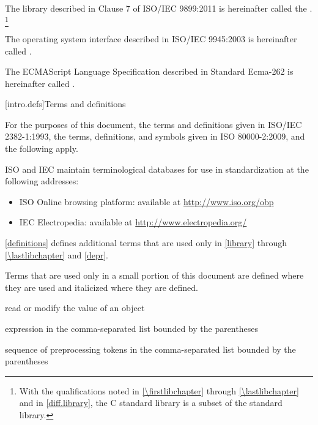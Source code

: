 \pnum
The library described in Clause 7 of ISO/IEC 9899:2011
is hereinafter called the
.%
\footnote{With the qualifications noted in \ref{\firstlibchapter}
through \ref{\lastlibchapter} and in \ref{diff.library}, the C standard
library is a subset of the \Cpp standard library.}

\pnum
The operating system interface described in ISO/IEC 9945:2003 is
hereinafter called .

\pnum
The ECMAScript Language Specification described in Standard Ecma-262 is
hereinafter called .

[intro.defs]{Terms and definitions}

\pnum
{}%
For the purposes of this document,
the terms and definitions
given in ISO/IEC 2382-1:1993,
the terms, definitions, and symbols
given in ISO 80000-2:2009,
and the following apply.

\pnum
ISO and IEC maintain terminological databases
for use in standardization
at the following addresses:
\begin{itemize}
\item ISO Online browsing platform: available at \url{http://www.iso.org/obp}
\item IEC Electropedia: available at \url{http://www.electropedia.org/}
\end{itemize}

\pnum
\ref{definitions}
defines additional terms that are used only in \ref{library}
through \ref{\lastlibchapter} and \ref{depr}.

\pnum
Terms that are used only in a small portion of this document
are defined where they are used and italicized where they are
defined.

%
 read or modify the value of an object

%
 expression in the
comma-separated list bounded by the parentheses

%
%
 sequence of preprocessing tokens in the
comma-separated list bounded by the parentheses

